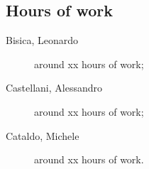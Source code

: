 \documentclass[12pt, a4paper]{article}
\begin{document}
		\subsection{Hours of work}
			\begin{description}
				\item[Bisica, Leonardo] around xx hours of work;
				\item[Castellani, Alessandro] around xx hours of work;
				\item[Cataldo, Michele] around xx hours of work.
			\end{description}
			
\end{document}
